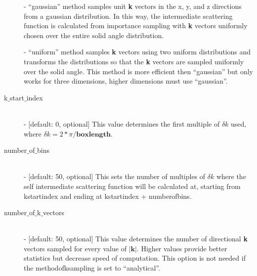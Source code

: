 \documentclass{article}
\begin{document}
\begin{description}
	- ``gaussian'' method samples unit \textbf{k} vectors in the x, y, and z directions from a gaussian distribution.  In this way, the intermediate scattering function is calculated from importance sampling with \textbf{k} vectors uniformly chosen over the entire solid angle distribution.
	
	- ``uniform'' method samples \textbf{k} vectors using two uniform distributions and transforms the distributions so that the \textbf{k} vectors are sampled uniformly over the solid angle.  This method is more efficient then ``gaussian'' but only works for three dimensions, higher dimensions must use ``gaussian''.
	
	\item[k$\_$start$\_$index] \hfill \\
	- [default: 0, optional] This value determines the first multiple of $\delta k$ used, where $\delta k = 2*\pi/\textbf{boxlength}$.  
	
	\item[number$\_$of$\_$bins] \hfill \\
	- [default: 50, optional] This sets the number of multiples of $\delta k$ where the self intermediate scattering function will be calculated at, starting from kstartindex and ending at kstartindex + numberofbins. 
	
	\item[number$\_$of$\_$k$\_$vectors] \hfill \\
	- [default: 50, optional] This value determines the number of directional \textbf{k} vectors sampled for every value of $|\bm{k}|$.  Higher values provide better statistics but decrease speed of computation.	This option is not needed if the methodofksampling is set to ``analytical''.	
	
\end{description}
\end{document}
